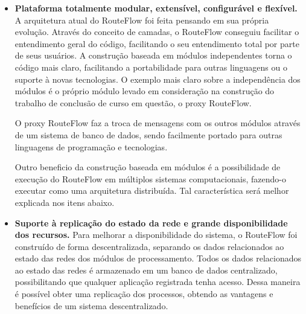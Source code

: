 \begin{itemize}
\item \textbf{Plataforma totalmente modular, extensível, 
configurável e flexível.} A arquitetura atual do RouteFlow 
foi feita pensando em sua própria evolução. Através do 
conceito de camadas, o RouteFlow conseguiu facilitar o entendimento
geral do código, facilitando o seu entendimento total por parte de 
seus usuários. A construção baseada em módulos independentes
torna o código mais claro, facilitando a portabilidade para outras 
linguagens ou o suporte à novas tecnologias. O exemplo mais 
claro sobre a independência dos módulos é o próprio módulo levado em consideração
na construção do trabalho de conclusão de curso em questão, o
proxy RouteFlow. 

O proxy RouteFlow faz a troca de mensagens com os outros módulos 
através de um sistema de banco de dados, sendo facilmente
portado para outras linguagens de programação e tecnologias.

Outro beneficio da construção baseada em módulos é a possibilidade
de execução do RouteFlow em múltiplos sistemas computacionais, 
fazendo-o executar como uma arquitetura distribuída. Tal 
característica será melhor explicada nos itens abaixo.
\item \textbf{Suporte à replicação do estado da rede e grande
disponibilidade dos recursos.} Para melhorar a disponibilidade
do sistema, o RouteFlow foi construído de forma descentralizada, 
separando os dados relacionados ao estado das redes dos módulos de processamento.
Todos os dados relacionados ao estado das redes é armazenado
em um banco de dados centralizado, possibilitando que qualquer aplicação 
registrada tenha acesso. Dessa maneira é possível obter uma 
replicação dos processos, obtendo as vantagens e benefícios
de um sistema descentralizado. 


\end{itemize}
